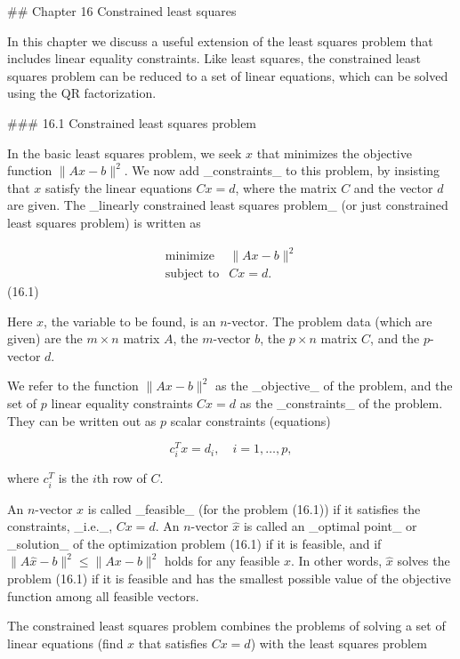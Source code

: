 

## Chapter 16 Constrained least squares

In this chapter we discuss a useful extension of the least squares problem that includes linear equality constraints. Like least squares, the constrained least squares problem can be reduced to a set of linear equations, which can be solved using the QR factorization.

### 16.1 Constrained least squares problem

In the basic least squares problem, we seek \(x\) that minimizes the objective function \(\|Ax-b\|^{2}\). We now add _constraints_ to this problem, by insisting that \(x\) satisfy the linear equations \(Cx=d\), where the matrix \(C\) and the vector \(d\) are given. The _linearly constrained least squares problem_ (or just constrained least squares problem) is written as

\[\begin{array}{ll}\mbox{minimize}&\|Ax-b\|^{2}\\ \mbox{subject to}&Cx=d.\end{array}\] (16.1)

Here \(x\), the variable to be found, is an \(n\)-vector. The problem data (which are given) are the \(m\times n\) matrix \(A\), the \(m\)-vector \(b\), the \(p\times n\) matrix \(C\), and the \(p\)-vector \(d\).

We refer to the function \(\|Ax-b\|^{2}\) as the _objective_ of the problem, and the set of \(p\) linear equality constraints \(Cx=d\) as the _constraints_ of the problem. They can be written out as \(p\) scalar constraints (equations)

\[c_{i}^{T}x=d_{i},\quad i=1,\ldots,p,\]

where \(c_{i}^{T}\) is the \(i\)th row of \(C\).

An \(n\)-vector \(x\) is called _feasible_ (for the problem (16.1)) if it satisfies the constraints, _i.e._, \(Cx=d\). An \(n\)-vector \(\hat{x}\) is called an _optimal point_ or _solution_ of the optimization problem (16.1) if it is feasible, and if \(\|A\hat{x}-b\|^{2}\leq\|Ax-b\|^{2}\) holds for any feasible \(x\). In other words, \(\hat{x}\) solves the problem (16.1) if it is feasible and has the smallest possible value of the objective function among all feasible vectors.

The constrained least squares problem combines the problems of solving a set of linear equations (find \(x\) that satisfies \(Cx=d\)) with the least squares problem